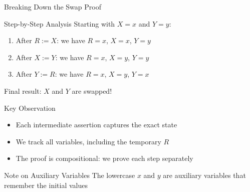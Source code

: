 \begin{frame}{Breaking Down the Swap Proof}
    \begin{block}{Step-by-Step Analysis}
        Starting with $X=x$ and $Y=y$:
        \begin{enumerate}
            \item After $R:=X$: we have $R=x$, $X=x$, $Y=y$
            \item After $X:=Y$: we have $R=x$, $X=y$, $Y=y$ 
            \item After $Y:=R$: we have $R=x$, $X=y$, $Y=x$
        \end{enumerate}
        Final result: $X$ and $Y$ are swapped!
    \end{block}
    
    \begin{block}{Key Observation}
        \begin{itemize}
            \item Each intermediate assertion captures the exact state
            \item We track all variables, including the temporary $R$
            \item The proof is compositional: we prove each step separately
        \end{itemize}
    \end{block}
    
    \begin{alertblock}{Note on Auxiliary Variables}
        The lowercase $x$ and $y$ are auxiliary variables that remember the initial values
    \end{alertblock}
\end{frame}